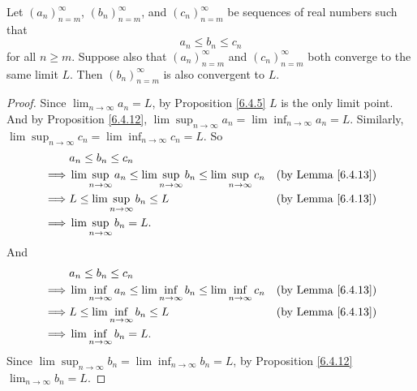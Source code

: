 \begin{corollary}\label{6.4.14}
    Let \((a_n)_{n = m}^\infty\), \((b_n)_{n = m}^\infty\), and \((c_n)_{n = m}^\infty\) be sequences of real numbers such that
    \[
        a_n \leq b_n \leq c_n
    \]
    for all \(n \geq m\).
    Suppose also that \((a_n)_{n = m}^\infty\) and \((c_n)_{n = m}^\infty\) both converge to the same limit \(L\).
    Then \((b_n)_{n = m}^\infty\) is also convergent to \(L\).
\end{corollary}

\begin{proof}
    Since \(\lim_{n \to \infty} a_n = L\), by Proposition \ref{6.4.5} \(L\) is the only limit point.
    And by Proposition \ref{6.4.12}, \(\lim\sup_{n \to \infty} a_n = \lim\inf_{n \to \infty} a_n = L\).
    Similarly, \(\lim\sup_{n \to \infty} c_n = \lim\inf_{n \to \infty} c_n = L\).
    So
    \begin{align*}
                 & a_n \leq b_n \leq c_n                                                                                                          \\
        \implies & \lim\sup_{n \to \infty} a_n \leq \lim\sup_{n \to \infty} b_n \leq \lim\sup_{n \to \infty} c_n & \text{(by Lemma \ref{6.4.13})} \\
        \implies & L \leq \lim\sup_{n \to \infty} b_n \leq L                                                     & \text{(by Lemma \ref{6.4.13})} \\
        \implies & \lim\sup_{n \to \infty} b_n = L.
    \end{align*}
    And
    \begin{align*}
                 & a_n \leq b_n \leq c_n                                                                                                          \\
        \implies & \lim\inf_{n \to \infty} a_n \leq \lim\inf_{n \to \infty} b_n \leq \lim\inf_{n \to \infty} c_n & \text{(by Lemma \ref{6.4.13})} \\
        \implies & L \leq \lim\inf_{n \to \infty} b_n \leq L                                                     & \text{(by Lemma \ref{6.4.13})} \\
        \implies & \lim\inf_{n \to \infty} b_n = L.
    \end{align*}
    Since \(\lim\sup_{n \to \infty} b_n = \lim\inf_{n \to \infty} b_n = L\), by Proposition \ref{6.4.12} \(\lim_{n \to \infty} b_n = L\).
\end{proof}

